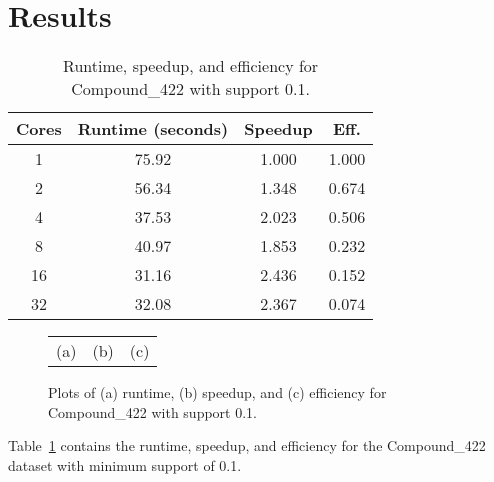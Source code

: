 \section{Results}
\label{sec:results}

\begin{table}
\centering
\begin{tabular}{cccc}
\hline
Cores & Runtime (seconds) & Speedup &  Eff.  \\
\hline
 1    &   75.92    &  1.000 & 1.000 \\
 2    &   56.34    &  1.348 & 0.674 \\
 4    &   37.53    &  2.023 & 0.506 \\
 8    &   40.97    &  1.853 & 0.232 \\
16    &   31.16    &  2.436 & 0.152 \\
32    &   32.08    &  2.367 & 0.074 \\
\hline
\end{tabular}
\caption{Runtime, speedup, and efficiency for Compound\_422 with support
         0.1.}
\label{tab:compound}
\end{table}

\begin{figure}
\centering
\begin{tabular}{ccc}
(a) & (b) & (c) \\
\end{tabular}
\caption{Plots of (a) runtime, (b) speedup, and (c) efficiency for
         Compound\_422 with support 0.1.}
\label{fig:compound}
\end{figure}

Table~\ref{tab:compound} contains the runtime, speedup, and efficiency for
the Compound\_422 dataset with minimum support of 0.1.
